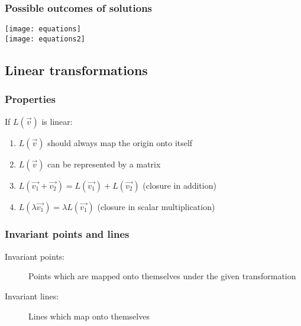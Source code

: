 \subsubsection{Possible outcomes of solutions}
\texttt{[image: equations]}\\
\texttt{[image: equations2]}

\subsection{Linear transformations}
\subsubsection{Properties}
If $L(\vec{v})$ is linear:
\begin{enumerate}
	\item $L(\vec{v})$ should always map the origin onto itself
	\item $L(\vec{v})$ can be represented by a matrix
	\item $L(\vec{v_1}+\vec{v_2})=L(\vec{v_1})+L(\vec{v_2})$ (closure in addition)
	\item $L(\lambda\vec{v_1})=\lambda L(\vec{v_1})$ (closure in scalar multiplication)
\end{enumerate}
\subsubsection{Invariant points and lines}
\begin{description}
	\item[Invariant points:] Points which are mapped onto themselves under the given transformation
	\item[Invariant lines:] Lines which map onto themselves
\end{description}

